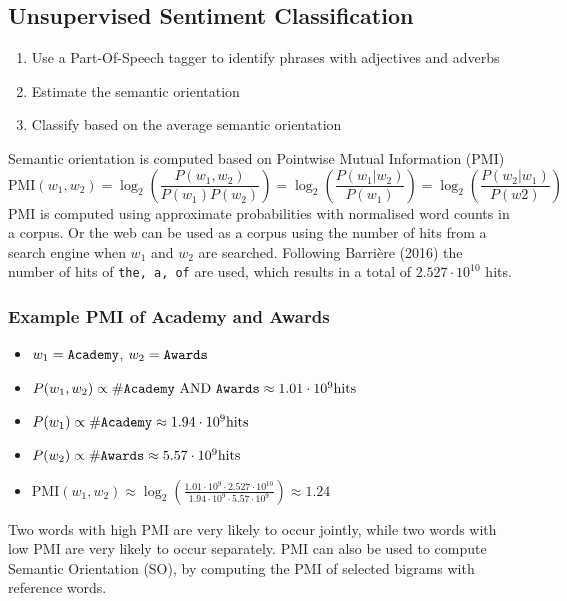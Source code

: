 \documentclass[11pt]{article}
\begin{document}
\subsection{Unsupervised Sentiment Classification}
\begin{enumerate}
	\item Use a Part-Of-Speech tagger to identify phrases with adjectives and adverbs
	\item Estimate the semantic orientation
	\item Classify based on the average semantic orientation
\end{enumerate}
Semantic orientation is computed based on Pointwise Mutual Information (PMI)
\begin{equation*}
\text{PMI} (w_1,w_2) = \log_2 \left( \frac{P(w_1,w_2)}{P(w_1)P(w_2)} \right) = \log_2 \left( \frac{P(w_1 | w_2)}{P(w_1)} \right) = \log_2 \left( \frac{P(w_2 | w_1)}{P(w2)} \right)
\end{equation*}
PMI is computed using approximate probabilities with normalised word counts in a corpus. Or the web can be used as a corpus using the number of hits from a search engine when $w_1$ and $w_2$ are searched. Following Barrière (2016) the number of hits of \texttt{the, a, of} are used, which results in a total of $2.527\cdot 10^{10}$ hits.
\subsubsection{Example PMI of Academy and Awards}
\begin{itemize}
	\item $w_1 = \text{\texttt{Academy}}$, $w_2 = \text{\texttt{Awards}}$
	\item $P(w_1,w_2) \propto \text{\#\texttt{Academy} AND \texttt{Awards}} \approx 1.01\cdot 10^9\text{hits}$
	\item $P(w_1) \propto \text{\#\texttt{Academy}} \approx 1.94\cdot 10^9 \text{hits}$
	\item $P(w_2) \propto\text{\#\texttt{Awards}} \approx 5.57\cdot 10^9\text{hits} $
	\item $\text{PMI}(w_1,w_2) \approx \log_2\left( \frac{1.01\cdot 10^9\cdot2.527\cdot 10^{10}}{1.94\cdot 10^9\cdot 5.57\cdot 10^9} \right)\approx 1.24 $
\end{itemize}
Two words with high PMI are very likely to occur jointly, while two words with low PMI are very likely to occur separately. PMI can also be used to compute Semantic Orientation (SO), by computing the PMI of selected bigrams with reference words.
\end{document}

